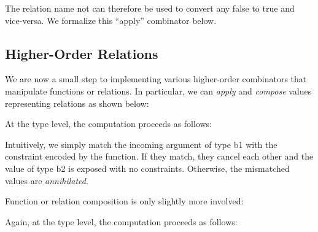 \documentclass{llncs}
\begin{document}
%

\noindent The relation {{name not}} can therefore be used to convert any
{{false}} to {{true}} and vice-versa. We formalize this ``apply'' combinator
below.

\subsection{Higher-Order Relations}

We are now a small step to implementing various higher-order
combinators that manipulate functions or relations. In particular, we
can \emph{apply} and \emph{compose} values representing relations as
shown below:


\noindent At the type level, the computation proceeds as follows:

\noindent Intuitively, we simply match the incoming argument of type {{b1}} with
the constraint encoded by the function. If they match, they cancel
each other and the value of type {{b2}} is exposed with no
constraints. Otherwise, the mismatched values are \emph{annihilated}.

Function or relation composition is only slightly more involved:


\noindent Again, at the type level, the computation proceeds as follows:


\end{document}

